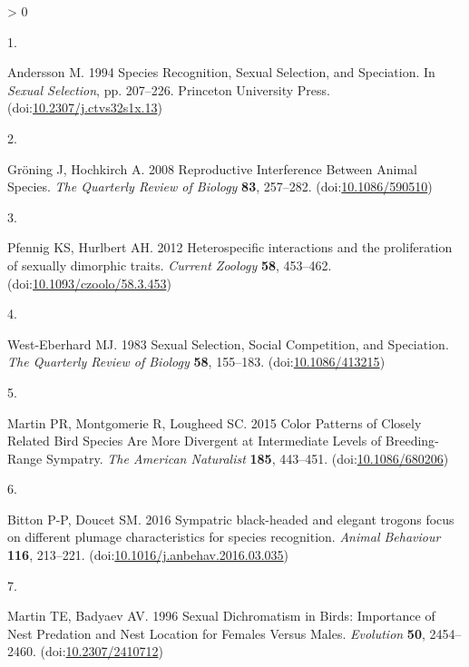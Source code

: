 \documentclass[
  a4paper,
]{article}
\newlength{\cslhangindent}
\newlength{\csllabelwidth}
\newenvironment{CSLReferences}[2] %
 {%
  \setlength{\parindent}{0pt}
  \ifodd #1 \everypar{\setlength{\hangindent}{\cslhangindent}}\ignorespaces\fi
  \ifnum #2 > 0
  \setlength{\parskip}{#2\baselineskip}
  \fi
 }%
 {}
\newcommand{\CSLLeftMargin}[1]{\parbox[t]{\csllabelwidth}{#1}}
\newcommand{\CSLRightInline}[1]{\parbox[t]{\linewidth - \csllabelwidth}{#1}\break}
\begin{document}
\hypertarget{refs}{}
\begin{CSLReferences}{0}{0}
\leavevmode\hypertarget{ref-andersson1994}{}%
\CSLLeftMargin{1. }
\CSLRightInline{Andersson M. 1994 Species {Recognition}, {Sexual
Selection}, and {Speciation}. In \emph{Sexual {Selection}}, pp.
207--226. {Princeton University Press}.
(doi:\href{https://doi.org/10.2307/j.ctvs32s1x.13}{10.2307/j.ctvs32s1x.13})}

\leavevmode\hypertarget{ref-groning2008}{}%
\CSLLeftMargin{2. }
\CSLRightInline{Gröning J, Hochkirch A. 2008 Reproductive {Interference
Between Animal Species}. \emph{The Quarterly Review of Biology}
\textbf{83}, 257--282.
(doi:\href{https://doi.org/10.1086/590510}{10.1086/590510})}

\leavevmode\hypertarget{ref-pfennig2012}{}%
\CSLLeftMargin{3. }
\CSLRightInline{Pfennig KS, Hurlbert AH. 2012 Heterospecific
interactions and the proliferation of sexually dimorphic traits.
\emph{Current Zoology} \textbf{58}, 453--462.
(doi:\href{https://doi.org/10.1093/czoolo/58.3.453}{10.1093/czoolo/58.3.453})}

\leavevmode\hypertarget{ref-west-eberhard1983}{}%
\CSLLeftMargin{4. }
\CSLRightInline{West-Eberhard MJ. 1983 Sexual {Selection}, {Social
Competition}, and {Speciation}. \emph{The Quarterly Review of Biology}
\textbf{58}, 155--183.
(doi:\href{https://doi.org/10.1086/413215}{10.1086/413215})}

\leavevmode\hypertarget{ref-martin2015a}{}%
\CSLLeftMargin{5. }
\CSLRightInline{Martin PR, Montgomerie R, Lougheed SC. 2015 Color
{Patterns} of {Closely Related Bird Species Are More Divergent} at
{Intermediate Levels} of {Breeding}-{Range Sympatry}. \emph{The American
Naturalist} \textbf{185}, 443--451.
(doi:\href{https://doi.org/10.1086/680206}{10.1086/680206})}

\leavevmode\hypertarget{ref-bitton2016}{}%
\CSLLeftMargin{6. }
\CSLRightInline{Bitton P-P, Doucet SM. 2016 Sympatric black-headed and
elegant trogons focus on different plumage characteristics for species
recognition. \emph{Animal Behaviour} \textbf{116}, 213--221.
(doi:\href{https://doi.org/10.1016/j.anbehav.2016.03.035}{10.1016/j.anbehav.2016.03.035})}

\leavevmode\hypertarget{ref-martin1996}{}%
\CSLLeftMargin{7. }
\CSLRightInline{Martin TE, Badyaev AV. 1996 Sexual {Dichromatism} in
{Birds}: {Importance} of {Nest Predation} and {Nest Location} for
{Females Versus Males}. \emph{Evolution} \textbf{50}, 2454--2460.
(doi:\href{https://doi.org/10.2307/2410712}{10.2307/2410712})}


\end{CSLReferences}
\end{document}
